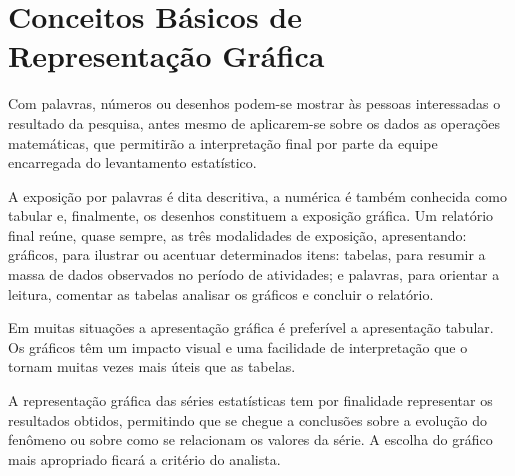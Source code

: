 






\section{Conceitos Básicos de Representação Gráfica}

\inic Com palavras, números ou desenhos podem-se mostrar às pessoas interessadas o resultado da pesquisa, antes mesmo de aplicarem-se sobre os dados as operações matemáticas, que permitirão a interpretação final por parte da equipe encarregada do levantamento estatístico.\vskip0.3cm

A exposição por palavras é dita descritiva, a numérica é também conhecida como tabular e, finalmente, os desenhos constituem a exposição gráfica. Um relatório final reúne, quase sempre, as três modalidades de exposição, apresentando: gráficos, para ilustrar ou acentuar determinados itens: tabelas, para resumir a massa de dados observados no período de atividades; e palavras, para orientar a leitura, comentar as tabelas analisar os gráficos e concluir o relatório.\vskip0.3cm

Em muitas situações a apresentação gráfica é preferível a apresentação tabular. Os gráficos têm um impacto visual e uma facilidade de interpretação que o tornam muitas vezes mais úteis que as tabelas.\vskip0.3cm

A representação gráfica das séries estatísticas tem por finalidade representar os resultados obtidos, permitindo que se chegue a conclusões sobre a evolução do fenômeno ou sobre como se relacionam os valores da série. A escolha do gráfico mais apropriado ficará a critério do analista.\vskip0.3cm

